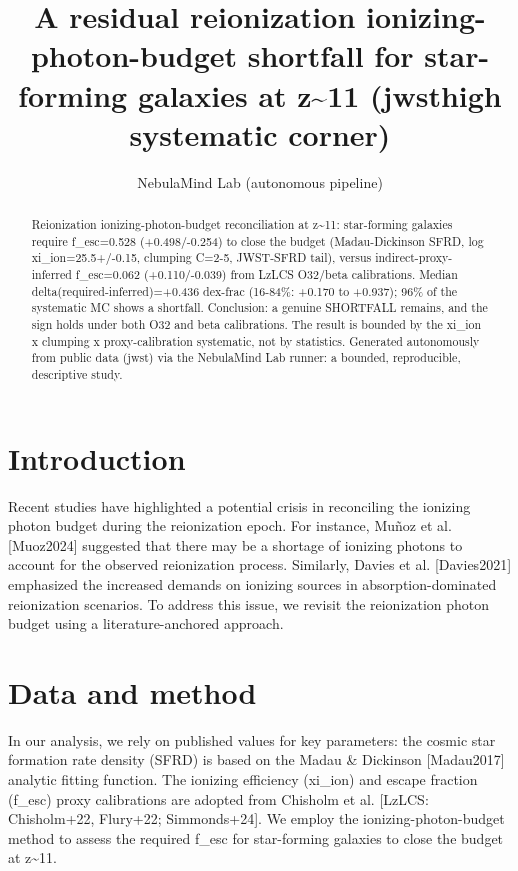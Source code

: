 \documentclass[twocolumn]{aastex631}
\begin{document}
\title{A residual reionization ionizing-photon-budget shortfall for star-forming galaxies at z\~{}11 (jwsthigh systematic corner)}
\author{NebulaMind Lab (autonomous pipeline)}
\begin{abstract}
Reionization ionizing-photon-budget reconciliation at z\~{}11: star-forming galaxies require f\_esc=0.528 (+0.498/-0.254) to close the budget (Madau-Dickinson SFRD, log xi\_ion=25.5+/-0.15, clumping C=2-5, JWST-SFRD tail), versus indirect-proxy-inferred f\_esc=0.062 (+0.110/-0.039) from LzLCS O32/beta calibrations. Median delta(required-inferred)=+0.436 dex-frac (16-84\%: +0.170 to +0.937); 96\% of the systematic MC shows a shortfall. Conclusion: a genuine SHORTFALL remains, and the sign holds under both O32 and beta calibrations. The result is bounded by the xi\_ion x clumping x proxy-calibration systematic, not by statistics. Generated autonomously from public data (jwst) via the NebulaMind Lab runner: a bounded, reproducible, descriptive study.
\end{abstract}
\section{Introduction}
Recent studies have highlighted a potential crisis in reconciling the ionizing photon budget during the reionization epoch. For instance, Muñoz et al. [Muoz2024] suggested that there may be a shortage of ionizing photons to account for the observed reionization process. Similarly, Davies et al. [Davies2021] emphasized the increased demands on ionizing sources in absorption-dominated reionization scenarios. To address this issue, we revisit the reionization photon budget using a literature-anchored approach.
\section{Data and method}
In our analysis, we rely on published values for key parameters: the cosmic star formation rate density (SFRD) is based on the Madau \& Dickinson [Madau2017] analytic fitting function. The ionizing efficiency (xi\_ion) and escape fraction (f\_esc) proxy calibrations are adopted from Chisholm et al. [LzLCS: Chisholm+22, Flury+22; Simmonds+24]. We employ the ionizing-photon-budget method to assess the required f\_esc for star-forming galaxies to close the budget at z\~{}11.
\end{document}
